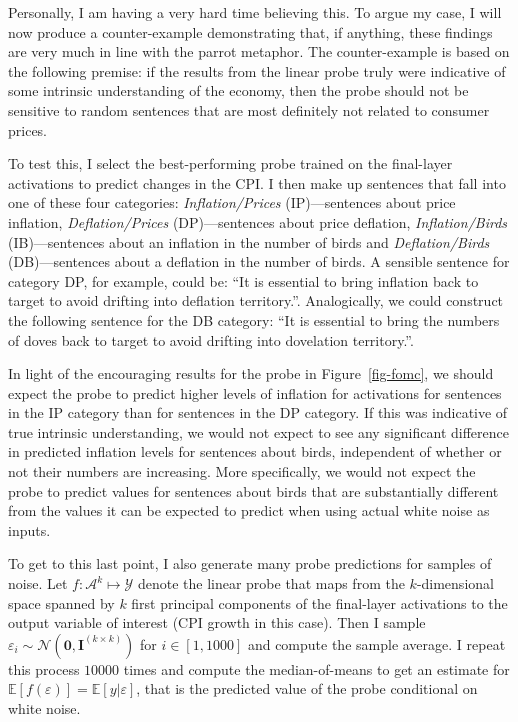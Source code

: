 \documentclass[
  letterpaper,
  DIV=11,
  numbers=noendperiod]{scrartcl}
\theoremstyle{plain}
\theoremstyle{remark}
\begin{document}
Personally, I am having a very hard time believing this. To argue my
case, I will now produce a counter-example demonstrating that, if
anything, these findings are very much in line with the parrot metaphor.
The counter-example is based on the following premise: if the results
from the linear probe truly were indicative of some intrinsic
understanding of the economy, then the probe should not be sensitive to
random sentences that are most definitely not related to consumer
prices.

To test this, I select the best-performing probe trained on the
final-layer activations to predict changes in the CPI. I then make up
sentences that fall into one of these four categories:
\emph{Inflation/Prices} (IP)---sentences about price inflation,
\emph{Deflation/Prices} (DP)---sentences about price deflation,
\emph{Inflation/Birds} (IB)---sentences about an inflation in the number
of birds and \emph{Deflation/Birds} (DB)---sentences about a deflation
in the number of birds. A sensible sentence for category DP, for
example, could be: ``It is essential to bring inflation back to target
to avoid drifting into deflation territory.''. Analogically, we could
construct the following sentence for the DB category: ``It is essential
to bring the numbers of doves back to target to avoid drifting into
dovelation territory.''.

In light of the encouraging results for the probe in
Figure~\ref{fig-fomc}, we should expect the probe to predict higher
levels of inflation for activations for sentences in the IP category
than for sentences in the DP category. If this was indicative of true
intrinsic understanding, we would not expect to see any significant
difference in predicted inflation levels for sentences about birds,
independent of whether or not their numbers are increasing. More
specifically, we would not expect the probe to predict values for
sentences about birds that are substantially different from the values
it can be expected to predict when using actual white noise as inputs.

To get to this last point, I also generate many probe predictions for
samples of noise. Let \(f: \mathcal{A}^k \mapsto \mathcal{Y}\) denote
the linear probe that maps from the \(k\)-dimensional space spanned by
\(k\) first principal components of the final-layer activations to the
output variable of interest (CPI growth in this case). Then I sample
\(\varepsilon_i \sim \mathcal{N}(\mathbf{0},\mathbf{I}^{(k \times k)})\)
for \(i \in [1,1000]\) and compute the sample average. I repeat this
process \(10000\) times and compute the median-of-means to get an
estimate for \(\mathbb{E}[f(\varepsilon)]=\mathbb{E}[y|\varepsilon]\),
that is the predicted value of the probe conditional on white noise.
\end{document}
